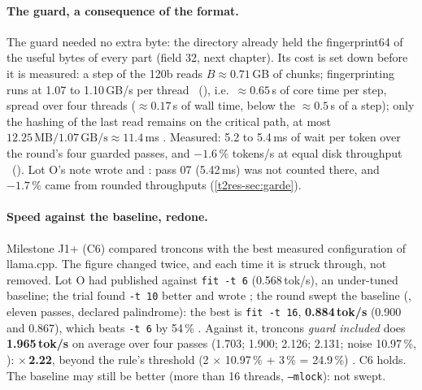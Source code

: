 \paragraph{The guard, a consequence of the format.} The guard needed no extra byte: the directory already held the fingerprint64 of the useful bytes of every part (field 32, next chapter). Its cost is set down before it is measured: a step of the 120b reads $B \approx 0.71$\,GB of chunks; fingerprinting runs at 1.07 to 1.10\,GB/s per thread \mes~(), i.e.\ $\approx 0.65$\,s of core time per step, spread over four threads ($\approx 0.17$\,s of wall time, below the $\approx 0.5$\,s of a step); only the hashing of the last read remains on the critical path, at most $12.25\,\mathrm{MB} / 1.07\,\mathrm{GB/s} \approx 11.4$\,ms \calc. Measured: 5.2 to 5.4\,ms of wait per token over the round's four guarded passes, and $-1.6\,\%$ tokens/s at equal disk throughput \mes~(). Lot O's note wrote  and : pass 07 (5.42\,ms) was not counted there, and $-1.7\,\%$ came from rounded throughputs (\cref{t2res-sec:garde}).

\paragraph{Speed against the baseline, redone.} Milestone J1+ (C6) compared troncons with the best measured configuration of llama.cpp. The figure changed twice, and each time it is struck through, not removed. Lot O had published  against \texttt{fit -t 6} (0.568\,tok/s), an under-tuned baseline; the trial found \texttt{-t 10} better and wrote ; the round swept the baseline (, eleven passes, declared palindrome): the best is \texttt{fit -t 16}, \textbf{0.884\,tok/s} (0.900 and 0.867), which beats \texttt{-t 6} by 54\,\% \mes. Against it, troncons \emph{guard included} does \textbf{1.965\,tok/s} on average over four passes (1.703; 1.900; 2.126; 2.131; noise 10.97\,\%, ): \textbf{$\times$\,2.22}, beyond the rule's threshold (2 $\times$ 10.97\,\% + 3\,\% = 24.9\,\%) \mes. C6 holds. The baseline may still be better (more than 16 threads, \texttt{--mlock}): not swept.

